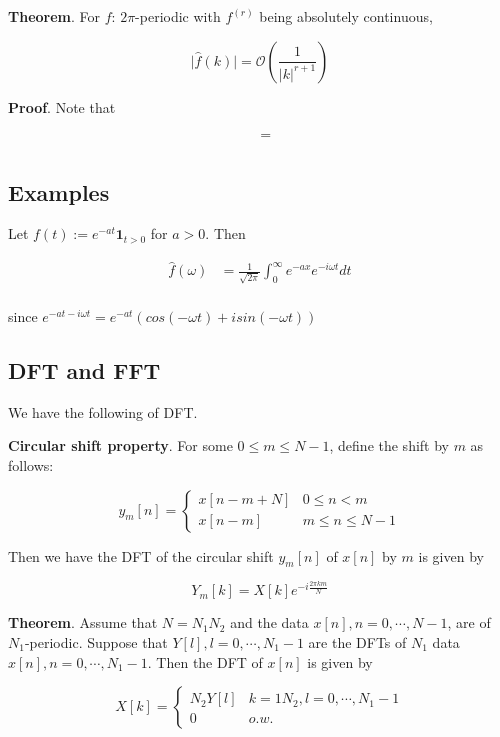 \documentclass[12pt]{article}
\theoremstyle{nonumberbreak}
\begin{document}
\begin{theorem}
\textbf{Theorem}. For $f$: $2\pi$-periodic with $f^{(r)}$ being absolutely continuous,

$$
\vert \hat{f}(k) \vert = \mathcal{O} \left( \frac{1}{|k|^{r+1}} \right)
$$
\end{theorem}

\textbf{Proof}. Note that 

$$
\begin{aligned}
 &= \\[8pt]
\end{aligned}
$$





\subsection*{Examples}

Let $f(t) := e^{-at} \mathbf{1}_{t>0}$ for $a >0$. Then

$$
\begin{aligned}
\hat{f}(\omega) &= \frac{1}{\sqrt{2\pi}} \int_0^\infty e^{-ax} e^{-i \omega t} dt \\[8pt]
\end{aligned}
$$

since $e^{-at - i\omega t} = e^{-at} \left( cos(-\omega t) + i sin( - \omega t) \right) $ 



\subsection*{DFT and FFT}


We have the following  of DFT. 



\begin{theorem}
\textbf{Circular shift property}. For some $0 \le m \le N-1$, define the shift by $m$ as follows:

$$
y_m[n] = \begin{cases} 
x[n-m+N] & 0 \le n < m \\
x[n-m] & m \le n \le N-1
\end{cases}
$$

Then we have the DFT of the circular shift $y_m[n]$ of $x[n]$ by $m$ is given by

$$
Y_m[k] = X[k] e^{-i \frac{2\pi km}{N}}
$$
\end{theorem}




\begin{theorem}
\textbf{Theorem}. Assume that $N=N_1N_2$ and the data $x[n], n=0,\cdots,N-1$, are of $N_1$-periodic. Suppose that $Y[l], l=0,\cdots,N_1-1$ are the DFTs of $N_1$ data $x[n], n=0,\cdots,N_1-1$. Then the DFT of $x[n]$ is given by

$$
X[k] = \begin{cases} 
N_2 Y[l] & k=1N_2, l=0,\cdots,N_1-1 \\
0 & o.w.
\end{cases}
$$
\end{theorem}
\end{document}
